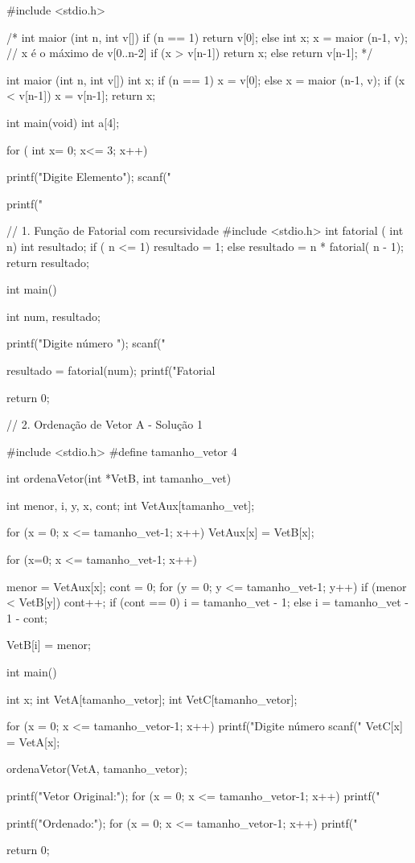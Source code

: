 #include <stdio.h>

/*
int maior (int n, int v[])
{ 
   if (n == 1)
      return v[0];
   else {
      int x;
      x = maior (n-1, v);
      // x é o máximo de v[0..n-2] 
      if (x > v[n-1]) return x;
      else return v[n-1]; 
   }
}*/

int maior (int n, int v[]) {
   int x;
   if (n == 1) x = v[0];
   else {
      x = maior (n-1, v); 
      if (x < v[n-1]) x = v[n-1];
   }
   return x;
}

int main(void) 
	int a[4];
	
	for ( int x= 0; x<= 3; x++){
	printf("Digite Elemento"); scanf("%
	
	printf("%
}

// 1. Função de Fatorial com recursividade  
#include <stdio.h>
int fatorial ( int n) {
    int resultado;
    if ( n <= 1)
        resultado = 1;
    else
        resultado = n * fatorial( n - 1);
    return resultado;
}

int main()
{   int num, resultado;
 
    printf("Digite número \n");
    scanf("%
 
    resultado = fatorial(num);
    printf("Fatorial %

    return 0;
}

// 2. Ordenação de Vetor A - Solução 1

#include <stdio.h>
#define tamanho_vetor 4

int ordenaVetor(int *VetB, int tamanho_vet){
    int menor, i, y, x, cont;
    int VetAux[tamanho_vet];
    
    for (x = 0; x <= tamanho_vet-1; x++)
      VetAux[x] = VetB[x];
    
    for (x=0; x <= tamanho_vet-1; x++) {
        menor = VetAux[x]; cont = 0;
        for (y = 0; y <= tamanho_vet-1; y++) {
            if (menor < VetB[y]) {
                cont++;
            }
        }
        if (cont == 0)
          i = tamanho_vet - 1;
        else
          i = tamanho_vet - 1 - cont;
        
        VetB[i] = menor;
    }
    
}

int main()
{   int x;
    int VetA[tamanho_vetor];
    int VetC[tamanho_vetor];

    for (x = 0; x <= tamanho_vetor-1; x++){
        printf("Digite número %
        scanf("%
        VetC[x] = VetA[x];
    }
    
    ordenaVetor(VetA, tamanho_vetor);
    
    printf("Vetor Original:");
    for (x = 0; x <= tamanho_vetor-1; x++){
        printf("%
    }

    printf("\nVetor Ordenado:");
    for (x = 0; x <= tamanho_vetor-1; x++){
        printf("%
    }

    return 0;
}

